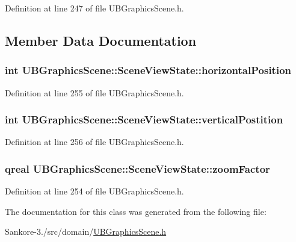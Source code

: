 Definition at line 247 of file U\-B\-Graphics\-Scene.\-h.



\subsection{Member Data Documentation}
\hypertarget{class_u_b_graphics_scene_1_1_scene_view_state_a24761f63e17a8a911e55367bc44bcafe}{
\subsubsection[{horizontal\-Position}]{\setlength{\rightskip}{0pt plus 5cm}int U\-B\-Graphics\-Scene\-::\-Scene\-View\-State\-::horizontal\-Position}}\label{d5/dec/class_u_b_graphics_scene_1_1_scene_view_state_a24761f63e17a8a911e55367bc44bcafe}


Definition at line 255 of file U\-B\-Graphics\-Scene.\-h.

\hypertarget{class_u_b_graphics_scene_1_1_scene_view_state_aef54a9ce8fd50a7dbec5a60435d2a84e}{
\subsubsection[{vertical\-Postition}]{\setlength{\rightskip}{0pt plus 5cm}int U\-B\-Graphics\-Scene\-::\-Scene\-View\-State\-::vertical\-Postition}}\label{d5/dec/class_u_b_graphics_scene_1_1_scene_view_state_aef54a9ce8fd50a7dbec5a60435d2a84e}


Definition at line 256 of file U\-B\-Graphics\-Scene.\-h.

\hypertarget{class_u_b_graphics_scene_1_1_scene_view_state_ac2cbae08e32cec5646f9671a47412876}{
\subsubsection[{zoom\-Factor}]{\setlength{\rightskip}{0pt plus 5cm}qreal U\-B\-Graphics\-Scene\-::\-Scene\-View\-State\-::zoom\-Factor}}\label{d5/dec/class_u_b_graphics_scene_1_1_scene_view_state_ac2cbae08e32cec5646f9671a47412876}


Definition at line 254 of file U\-B\-Graphics\-Scene.\-h.



The documentation for this class was generated from the following file\-:\begin{DoxyCompactItemize}
\item 
Sankore-\/3./src/domain/\hyperlink{_u_b_graphics_scene_8h}{U\-B\-Graphics\-Scene.\-h}\end{DoxyCompactItemize}

